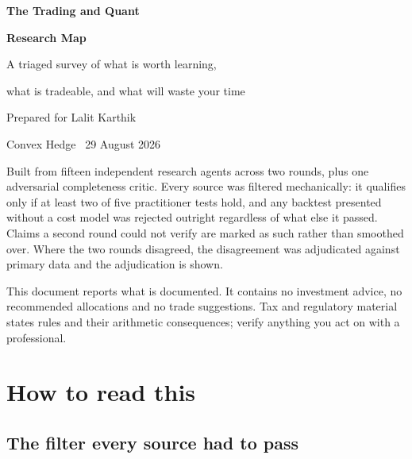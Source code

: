 \documentclass[11pt,a4paper]{article}
\begin{document}
\begin{titlepage}
\centering
\vspace*{2.5cm}
{\sffamily\Huge\bfseries\color{accent} The Trading and Quant\par}
\vspace{2mm}
{\sffamily\Huge\bfseries\color{accent} Research Map\par}
\vspace{7mm}
{\sffamily\large A triaged survey of what is worth learning,\par}
{\sffamily\large what is tradeable, and what will waste your time\par}
\vspace{14mm}
{\large Prepared for Lalit Karthik\par}
\vspace{2mm}
{\color{soft} Convex Hedge \textbullet\ 29 August 2026\par}
\vfill
\begin{minipage}{0.84\textwidth}
\footnotesize\color{soft}
Built from fifteen independent research agents across two rounds, plus one
adversarial completeness critic. Every source was filtered mechanically: it
qualifies only if at least two of five practitioner tests hold, and any backtest
presented without a cost model was rejected outright regardless of what else it
passed. Claims a second round could not verify are marked as such rather than
smoothed over. Where the two rounds disagreed, the disagreement was adjudicated
against primary data and the adjudication is shown.

\medskip
This document reports what is documented. It contains no investment advice, no
recommended allocations and no trade suggestions. Tax and regulatory material
states rules and their arithmetic consequences; verify anything you act on with a
professional.
\end{minipage}
\vspace{1.5cm}
\end{titlepage}

\tableofcontents
\newpage

\section{How to read this}

\subsection*{The filter every source had to pass}
\end{document}
